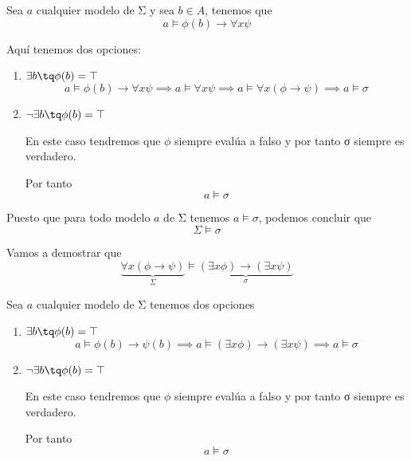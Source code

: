\begin{problem}
Sea $a$ cualquier modelo de Σ y sea $b \in A$, tenemos que
\[a \models \phi(b) \to \forall x \psi \]

Aquí tenemos dos opciones:
\begin{enumerate}
\item $\exists b \tq \phi(b)=\top$
\[a \models \phi(b) \to \forall x \psi \implies a \models \forall x \psi \implies a \models \forall x (\phi \to \psi) \implies a \models σ\]
\item $\neg \exists b \tq \phi(b) = \top$

En este caso tendremos que $\phi$ siempre evalúa a falso y por tanto σ siempre es verdadero.

Por tanto
\[a \models σ\]
\end{enumerate}

Puesto que para todo modelo $a$ de Σ tenemos $a \models σ$, podemos concluir que
\[Σ \models σ\]

\spart 

Vamos a demostrar que
\[\underbrace{\forall x (\phi \to \psi)}_{Σ} \models \underbrace{(\exists x  \phi )\to  (\exists x \psi)}_{σ}\]

Sea $a$ cualquier modelo de Σ tenemos dos opciones
\begin{enumerate}
\item $\exists b \tq \phi(b)=\top$
\[a \models \phi(b) \to \psi (b) \implies a \models (\exists x \phi) \to (\exists x \psi) \implies a \models σ\]
\item $\neg \exists b \tq \phi(b) = \top$

En este caso tendremos que $\phi$ siempre evalúa a falso y por tanto σ siempre es verdadero.

Por tanto
\[a \models σ\]
\end{enumerate}
\end{problem}


